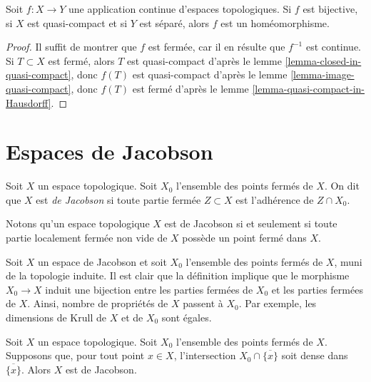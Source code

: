 \begin{lemma}
\label{lemma-bijective-map}
Soit $f : X \to Y$ une application continue d'espaces topologiques.
Si $f$ est bijective, si $X$ est quasi-compact et si $Y$ est séparé, alors
$f$ est un homéomorphisme.
\end{lemma}

\begin{proof}
Il suffit de montrer que $f$ est fermée, car il en résulte que $f^{-1}$ est
continue. Si $T \subset X$ est fermé, alors $T$ est quasi-compact d'après le
lemme \ref{lemma-closed-in-quasi-compact}, donc $f(T)$ est quasi-compact
d'après le lemme \ref{lemma-image-quasi-compact}, donc $f(T)$ est fermé
d'après le lemme \ref{lemma-quasi-compact-in-Hausdorff}.
\end{proof}












\section{Espaces de Jacobson}
\label{section-space-jacobson}

\begin{definition}
\label{definition-space-jacobson}
Soit $X$ un espace topologique.
Soit $X_0$ l'ensemble des points fermés de $X$.
On dit que $X$ est {\it de Jacobson} si toute
partie fermée $Z \subset X$ est l'adhérence
de $Z \cap X_0$.
\end{definition}

\noindent
Notons qu'un espace topologique $X$ est de Jacobson si et seulement si
toute partie localement fermée non vide de $X$
possède un point fermé dans $X$.

\medskip\noindent
Soit $X$ un espace de Jacobson et soit $X_0$ l'ensemble
des points fermés de $X$, muni de la topologie induite.
Il est clair que la définition implique que le morphisme
$X_0 \to X$ induit une bijection entre les parties fermées
de $X_0$ et les parties fermées de $X$.
Ainsi, nombre de propriétés de $X$ passent à $X_0$.
Par exemple, les dimensions de Krull de $X$ et de $X_0$
sont égales.

\begin{lemma}
\label{lemma-jacobson-check-irreducible-closed}
Soit $X$ un espace topologique. Soit $X_0$ l'ensemble
des points fermés de $X$.
Supposons que, pour tout point $x\in X$,
l'intersection $X_0 \cap \overline{\{x\}}$ soit dense dans $\overline{\{x\}}$.
Alors $X$ est de Jacobson.
\end{lemma}

